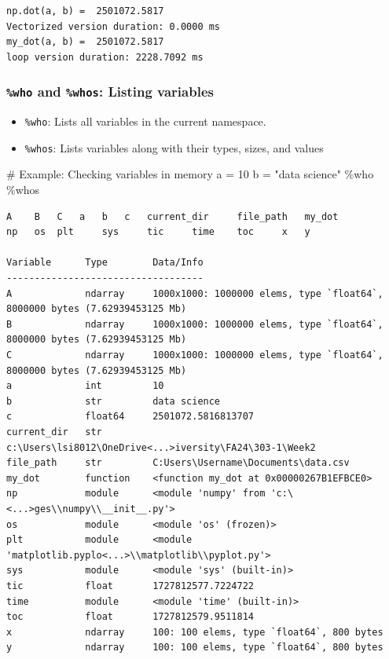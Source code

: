 \documentclass[
  letterpaper,
  DIV=11,
  numbers=noendperiod]{scrreprt}
\newenvironment{Shaded}{\begin{snugshade}}{\end{snugshade}}
\newcommand{\CommentTok}[1]{\textcolor[rgb]{0.37,0.37,0.37}{#1}}
\newcommand{\DecValTok}[1]{\textcolor[rgb]{0.68,0.00,0.00}{#1}}
\newcommand{\NormalTok}[1]{\textcolor[rgb]{0.00,0.23,0.31}{#1}}
\newcommand{\OperatorTok}[1]{\textcolor[rgb]{0.37,0.37,0.37}{#1}}
\newcommand{\StringTok}[1]{\textcolor[rgb]{0.13,0.47,0.30}{#1}}
\providecommand{\tightlist}{%
  \setlength{\itemsep}{0pt}\setlength{\parskip}{0pt}}\usepackage{longtable,booktabs,array}
\begin{document}
\begin{verbatim}
np.dot(a, b) =  2501072.5817
Vectorized version duration: 0.0000 ms 
my_dot(a, b) =  2501072.5817
loop version duration: 2228.7092 ms 
\end{verbatim}

\hypertarget{who-and-whos-listing-variables}{%
\subsubsection{\texorpdfstring{\texttt{\%who} and \texttt{\%whos}:
Listing
variables}{\%who and \%whos: Listing variables}}\label{who-and-whos-listing-variables}}

\begin{itemize}
\tightlist
\item
  \texttt{\%who}: Lists all variables in the current namespace.
\item
  \texttt{\%whos}: Lists variables along with their types, sizes, and
  values
\end{itemize}

\begin{Shaded}
\begin{Highlighting}[]
\CommentTok{\# Example: Checking variables in memory}
\NormalTok{a }\OperatorTok{=} \DecValTok{10}
\NormalTok{b }\OperatorTok{=} \StringTok{"data science"}
\OperatorTok{\%}\NormalTok{who}
\OperatorTok{\%}\NormalTok{whos }
\end{Highlighting}
\end{Shaded}

\begin{verbatim}
A    B   C   a   b   c   current_dir     file_path   my_dot  
np   os  plt     sys     tic     time    toc     x   y   

Variable      Type        Data/Info
-----------------------------------
A             ndarray     1000x1000: 1000000 elems, type `float64`, 8000000 bytes (7.62939453125 Mb)
B             ndarray     1000x1000: 1000000 elems, type `float64`, 8000000 bytes (7.62939453125 Mb)
C             ndarray     1000x1000: 1000000 elems, type `float64`, 8000000 bytes (7.62939453125 Mb)
a             int         10
b             str         data science
c             float64     2501072.5816813707
current_dir   str         c:\Users\lsi8012\OneDrive<...>iversity\FA24\303-1\Week2
file_path     str         C:Users\Username\Documents\data.csv
my_dot        function    <function my_dot at 0x00000267B1EFBCE0>
np            module      <module 'numpy' from 'c:\<...>ges\\numpy\\__init__.py'>
os            module      <module 'os' (frozen)>
plt           module      <module 'matplotlib.pyplo<...>\\matplotlib\\pyplot.py'>
sys           module      <module 'sys' (built-in)>
tic           float       1727812577.7224722
time          module      <module 'time' (built-in)>
toc           float       1727812579.9511814
x             ndarray     100: 100 elems, type `float64`, 800 bytes
y             ndarray     100: 100 elems, type `float64`, 800 bytes
\end{verbatim}
\end{document}
